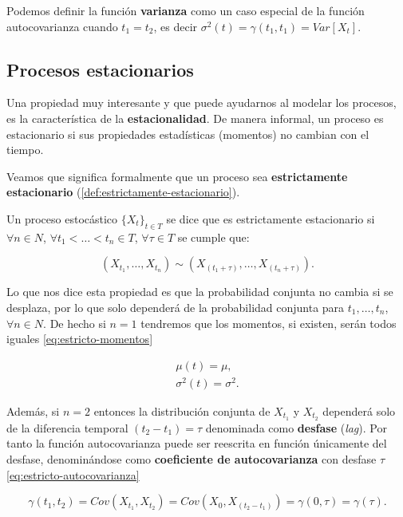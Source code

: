 Podemos definir la función \textbf{varianza} como un caso especial de la función autocovarianza cuando $t_1 = t_2$, es decir $\sigma^2(t) = \gamma(t_1, t_1) = Var[X_t]$.

\subsection{Procesos estacionarios}

Una propiedad muy interesante y que puede ayudarnos al modelar los procesos, es la característica de la \textbf{estacionalidad}. De manera informal, un proceso es estacionario si sus propiedades estadísticas (momentos) no cambian con el tiempo.

Veamos que significa formalmente que un proceso sea \textbf{estrictamente estacionario} (\autoref{def:estrictamente-estacionario}).

\begin{definicion}
  Un proceso estocástico $\{X_t\}_{t \in T}$ se dice que es estrictamente estacionario si $\forall n \in N$, $\forall t_1 < \ldots < t_n \in T$, $\forall \tau \in T$ se cumple que:

    $$\left( X_{t_1}, \ldots, X_{t_n}\right) \sim \left( X_{(t_1 + \tau)}, \ldots, X_{(t_n + \tau)}\right).$$
  \label{def:estrictamente-estacionario}
\end{definicion}

Lo que nos dice esta propiedad es que la probabilidad conjunta no cambia si se desplaza, por lo que solo dependerá de la probabilidad conjunta para $t_1, \ldots, t_n$, $\forall n \in N$. De hecho si $n=1$ tendremos que los momentos, si existen, serán todos iguales \eqref{eq:estricto-momentos}

\begin{gather}
  \mu(t) = \mu, \\
  \sigma^2(t) = \sigma^2.
  \label{eq:estricto-momentos}
\end{gather}

Además, si $n = 2$ entonces la distribución conjunta de $X_{t_1}$ y $X_{t_2}$ dependerá solo de la diferencia temporal $(t_2 - t_1) = \tau$ denominada como \textbf{desfase} (\emph{lag}). Por tanto la función autocovarianza puede ser reescrita en función únicamente del desfase, denominándose como \textbf{coeficiente de autocovarianza} con desfase $\tau$ \eqref{eq:estricto-autocovarianza}

\begin{equation}
  \gamma(t_1, t_2) = Cov(X_{t_1}, X_{t_2}) = Cov(X_{0}, X_{(t_2 - t_1)}) = \gamma(0, \tau) = \gamma(\tau).
  \label{eq:estricto-autocovarianza}
\end{equation}

